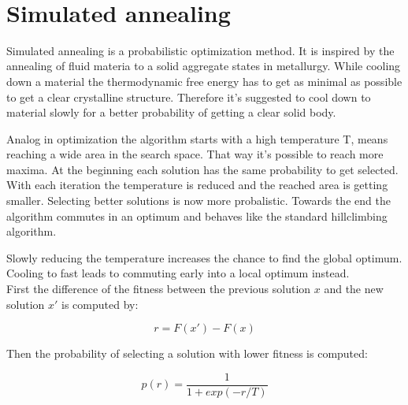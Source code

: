 \documentclass[10pt,a4paper,DIV=11]{scrreprt}
\begin{document}
 \\


\section{Simulated annealing}
Simulated annealing is a probabilistic optimization method.
It is inspired by the annealing of fluid materia to a solid aggregate states in metallurgy. While cooling down a material the thermodynamic free energy has to get as minimal as possible to get a clear crystalline structure. Therefore it's suggested to cool down to material slowly for a better probability of getting a clear solid body.

Analog in optimization the algorithm starts with a high temperature T, means reaching a wide area in the search space. That way it's possible to reach more maxima. At the beginning each solution has the same probability to get selected. With each iteration the temperature is reduced and the reached area is getting smaller. Selecting better solutions is now more probalistic.
Towards the end the algorithm commutes in an optimum and behaves like the standard hillclimbing algorithm.

Slowly reducing the temperature increases the chance to find the global optimum. Cooling to fast leads to commuting early into a local optimum instead. \\

First the difference of the fitness between the previous solution $x$ and the new solution $x'$ is computed by:

\begin{equation}
r = F(x') - F(x)
\end{equation} 

Then the probability of selecting a solution with lower fitness is computed:

\begin{equation}
p(r) = \frac{1}{1+exp(-r/T)}
\end{equation} 
\end{document}
